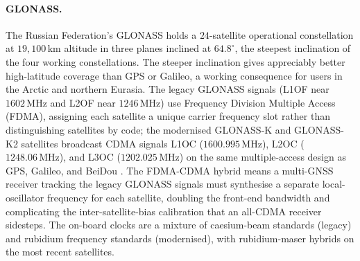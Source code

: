 \paragraph{GLONASS.} The Russian Federation's GLONASS holds a
$24$-satellite operational constellation at $19{,}100 \,\si{\kilo
\meter}$ altitude in three planes inclined at $64.8^{\circ}$, the
steepest inclination of the four working constellations. The
steeper inclination gives appreciably better high-latitude
coverage than GPS or Galileo, a working consequence for users in
the
Arctic and northern Eurasia. The legacy GLONASS signals (L1OF
near $1602 \,\si{\mega\hertz}$ and L2OF near $1246 \,\si{\mega
\hertz}$) use Frequency Division Multiple Access (FDMA), assigning
each satellite a unique carrier frequency slot rather than
distinguishing satellites by code; the modernised GLONASS-K and
GLONASS-K2 satellites broadcast CDMA signals L1OC
($1600.995 \,\si{\mega\hertz}$), L2OC ($1248.06 \,\si{\mega
\hertz}$), and L3OC ($1202.025 \,\si{\mega\hertz}$) on the same
multiple-access design as GPS, Galileo, and BeiDou
\cite{web:ch06t3b-glonass-icd-2016}. The FDMA-CDMA hybrid means a
multi-GNSS receiver tracking the legacy GLONASS signals must
synthesise a separate local-oscillator frequency for each
satellite, doubling the front-end bandwidth and complicating the
inter-satellite-bias calibration that an all-CDMA receiver
sidesteps. The on-board clocks are a mixture of caesium-beam
standards (legacy) and rubidium frequency standards (modernised),
with rubidium-maser hybrids on the most recent satellites.

